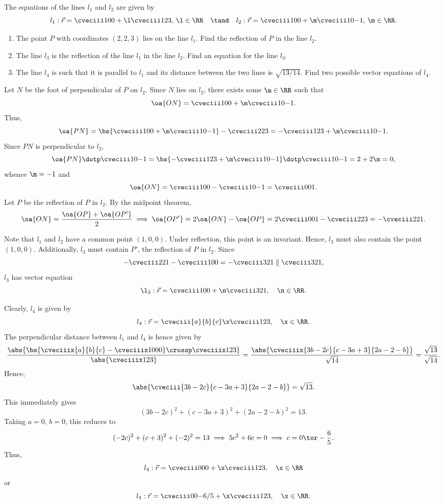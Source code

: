 \begin{problem}[\chili]
    The equations of the lines $l_1$ and $l_2$ are given by \[l_1: \vec r = \cveciii100 + \l \cveciii123, \, \l \in \RR \quad \tand \quad l_2: \vec r = \cveciii100 + \m \cveciii10{-1}, \, \m \in \RR.\]

    \begin{enumerate}
        \item The point $P$ with coordinates $(2, 2, 3)$ lies on the line $l_1$. Find the reflection of $P$ in the line $l_2$.
        \item The line $l_3$ is the reflection of the line $l_1$ in the line $l_2$. Find an equation for the line $l_3$.
        \item The line $l_4$ is such that it is parallel to $l_1$ and its distance between the two lines is $\sqrt{13/14}$. Find two possible vector equations of $l_4$.
    \end{enumerate}
\end{problem}
\begin{solution}
    \begin{ppart}
        Let $N$ be the foot of perpendicular of $P$ on $l_2$. Since $N$ lies on $l_2$, there exists some $\m \in \RR$ such that \[\oa{ON} = \cveciii100 + \m \cveciii10{-1}.\] Thus, \[\oa{PN} = \bs{\cveciii100 + \m \cveciii10{-1}} - \cveciii223 = -\cveciii123 + \m \cveciii10{-1}.\] Since $PN$ is perpendicular to $l_2$, \[\oa{PN} \dotp \cveciii10{-1} = \bs{-\cveciii123 + \m \cveciii10{-1}} \dotp \cveciii10{-1} = 2 + 2\m = 0,\] whence $\m = -1$ and \[\oa{ON} = \cveciii100 - \cveciii10{-1} = \cveciii001.\] Let $P$ be the reflection of $P$ in $l_2$. By the midpoint theorem, \[\oa{ON} = \frac{\oa{OP} + \oa{OP'}}{2} \implies \oa{OP'} = 2\oa{ON} - \oa{OP} = 2\cveciii001 - \cveciii223 = -\cveciii221.\]
    \end{ppart}
    \begin{ppart}
        Note that $l_1$ and $l_2$ have a common point $(1, 0, 0)$. Under reflection, this point is an invariant. Hence, $l_3$ must also contain the point $(1, 0, 0)$. Additionally, $l_3$ must contain $P'$, the reflection of $P$ in $l_2$. Since \[-\cveciii221 - \cveciii100 = -\cveciii321 \parallel \cveciii321,\] $l_3$ has vector equation \[\l_3 : \vec r = \cveciii100 + \n \cveciii321, \quad \n \in \RR.\]
    \end{ppart}
    \begin{ppart}
        Clearly, $l_4$ is given by \[l_4: \vec r = \cveciii{a}{b}{c} \x \cveciii123, \quad \x \in \RR.\] The perpendicular distance between $l_1$ and $l_4$ is hence given by \[\frac{\abs{\bs{\cveciiix{a}{b}{c} - \cveciiix1000} \crossp \cveciiix123}}{\abs{\cveciiix123}} = \frac{\abs{\cveciiix{3b-2c}{c-3a+3}{2a-2-b}}}{\sqrt{14}} = \frac{\sqrt{13}}{\sqrt{14}}.\] Hence, \[\abs{\cveciii{3b-2c}{c-3a+3}{2a-2-b}} = \sqrt{13}.\] This immediately gives \[(3b-2c)^2 + (c-3a+3)^2 + (2a-2-b)^2 = 13.\] Taking $a = 0$, $b=0$, this reduces to \[(-2c)^2 + (c+3)^2 + (-2)^2 = 13 \implies 5c^2 + 6c = 0 \implies c = 0 \tor -\frac65.\] Thus, \[l_4 : \vec r = \cveciii000 + \x \cveciii123, \quad \x \in \RR\] or \[l_4: \vec r = \cveciii00{-6/5} + \x \cveciii123, \quad \x \in \RR.\]
    \end{ppart}
\end{solution}